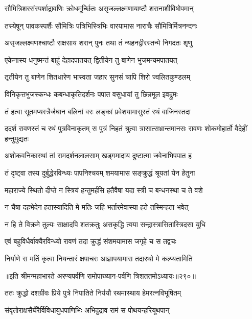 \twolineshloka
{सौमित्रिशरसंस्पर्शाद्रावणिः क्रोधमूर्च्छितः}
{असृजल्लक्ष्मणायाष्टौ शरानाशीविषोपमान्}


\twolineshloka
{तस्येषून् पावकस्पर्शैः सौमित्रिः पत्रिभिस्त्रिभिः}
{वारयामास नाराचैः सौमित्रिर्मित्रनन्दनः}


\twolineshloka
{असृजल्लक्ष्मणश्चाष्टौ राक्षसाय शरान् पुनः}
{तथा तं न्यहनद्वीरस्तन्मे निगदतः शृणु}


\twolineshloka
{एकेनास्य धनुष्मन्तं बाहुं देहादपातयत्}
{द्वितीयेन तु बाणेन भुजमन्यमपातयत्}


\twolineshloka
{तृतीयेन तु बाणेन शितधारेण भास्वता}
{जहार सुनसं चापि शिरो ज्वलितकुण्डलम्}


\twolineshloka
{विनिकृत्तभुजस्कन्धः कबन्धाकृतिदर्शनः}
{पपात वसुधायां तु छिन्नमूल इवद्रुमः}


\twolineshloka
{तं हत्वा सूतमप्यस्त्रैर्जघान बलिनां वरः}
{लङ्कां प्रवेशयामासुस्तं रथं वाजिनस्तदा}


\threelineshloka
{ददर्श रावणस्तं च रथं पुत्रविनाकृतम्}
{स पुत्रं निहतं श्रुत्वा त्रासात्सभ्रान्तमानसः}
{रावणः शोकमोहार्तो वैदेहीं हन्तुमुद्यतः}


\twolineshloka
{अशोकवनिकास्थां तां रामदर्शनलालसाम्}
{खड्गमादाय दुष्टात्मा जवेनाभिपपात ह}


\twolineshloka
{तं दृष्ट्वा तस्य दुर्बुद्धेरविन्ध्यः पापनिश्चयम्}
{शमयामास सङ्क्रुद्धं श्रूयतां येन हेतुना}


\twolineshloka
{महाराज्ये स्थितो दीप्ते न स्त्रियं हन्तुमर्हसि}
{हतैवैषा यदा स्त्री च बन्धनस्था च ते वशे}


\twolineshloka
{न चैषा दहभेदेन हतास्यादिति मे मतिः}
{जहि भर्तारमेवास्या हते तस्मिन्हता भवेत्}


\twolineshloka
{न हि ते विक्रमे तुल्यः साक्षादपि शतक्रतुः}
{असकृद्धि त्वया सन्द्रास्त्रासितास्त्रिदसा युधि}


\twolineshloka
{एवं बहुविधैर्वाक्यैरविन्ध्यो रावणं तदा}
{क्रुद्धं संशमयामास जगृहे च स तद्वचः}


\twolineshloka
{निर्याणे स मतिं कृत्वा नियन्तारं क्षपाचरः}
{आज्ञापयामास तदारथो मे कल्प्यतामिति}


॥इति श्रीमन्महाभारते अरण्यपर्वणि रामोपाख्यान-पर्वणि त्रिशततमोऽध्यायः॥२९०॥

\storymeta

\resetShloka



\twolineshloka
{ततः क्रुद्धो दशग्रीवः प्रिये पुत्रे निपातिते}
{निर्ययौ रथमास्थाय हेमरत्नविभूषितम्}


\twolineshloka
{संवृतोराक्षसैर्घेरैर्विविधायुधपाणिभिः}
{अभिदुद्राव रामं स पोथयन्हरियूथपान्}


